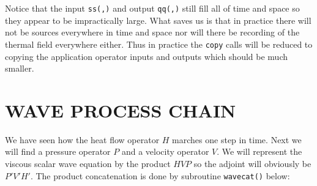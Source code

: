 
Notice that the input
{\tt ss(,)}
and output
{\tt qq(,)}
still fill all of time and space so they appear to be impractically large.
What saves us is that in practice
there will not be sources everywhere in time and space
nor will there be recording of the thermal field everywhere either.
Thus in practice
the {\tt copy} calls will be reduced to
copying the application operator inputs and outputs
which should be much smaller.

\section{WAVE PROCESS CHAIN}
We have seen how the heat flow operator $H$ marches one step in time.
Next we will find a pressure operator $P$
and a velocity operator $V$.
We will represent the viscous scalar wave equation by the product
$HVP$ so the adjoint will
obviously be $P'V'H'$.
The product concatenation is done by subroutine {\tt wavecat()} below:

